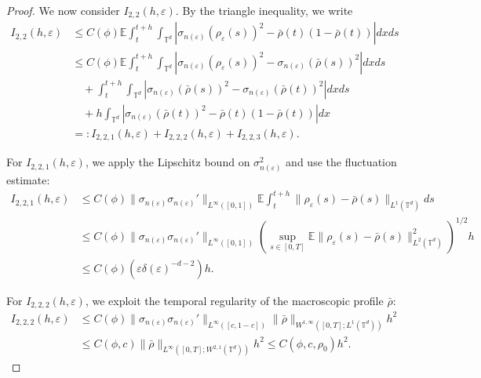 \documentclass[UTF-8,reqno]{amsart}
\numberwithin{equation}{section}
\def\leq{\leqslant}
\def\leq{\leqslant}
\begin{document}
\begin{proof}
\medskip

We now consider $ I_{2,2}(h,\varepsilon) $. By the triangle inequality, we write
\begin{align*}
I_{2,2}(h,\varepsilon)
&\leq C(\phi) \mathbb{E} \int_t^{t+h} \int_{\mathbb{T}^d} \left| \sigma_{n(\varepsilon)}(\rho_{\varepsilon}(s))^2 - \bar{\rho}(t)(1 - \bar{\rho}(t)) \right| dx ds \\
&\leq C(\phi) \mathbb{E} \int_t^{t+h} \int_{\mathbb{T}^d} \left| \sigma_{n(\varepsilon)}(\rho_{\varepsilon}(s))^2 - \sigma_{n(\varepsilon)}(\bar{\rho}(s))^2 \right| dx ds \\
&\quad + \int_t^{t+h} \int_{\mathbb{T}^d} \left| \sigma_{n(\varepsilon)}(\bar{\rho}(s))^2 - \sigma_{n(\varepsilon)}(\bar{\rho}(t))^2 \right| dx ds \\
&\quad + h \int_{\mathbb{T}^d} \left| \sigma_{n(\varepsilon)}(\bar{\rho}(t))^2 - \bar{\rho}(t)(1 - \bar{\rho}(t)) \right| dx \\
&=: I_{2,2,1}(h,\varepsilon) + I_{2,2,2}(h,\varepsilon) + I_{2,2,3}(h,\varepsilon).
\end{align*}

For $ I_{2,2,1}(h,\varepsilon) $, we apply the Lipschitz bound on $ \sigma_{n(\varepsilon)}^2 $ and use the fluctuation estimate:
\begin{align*}
I_{2,2,1}(h,\varepsilon)
&\leq C(\phi) \| \sigma_{n(\varepsilon)} \sigma_{n(\varepsilon)}' \|_{L^{\infty}([0,1])} 
\mathbb{E} \int_t^{t+h} \| \rho_{\varepsilon}(s) - \bar{\rho}(s) \|_{L^1(\mathbb{T}^d)} ds \\
&\leq C(\phi) \| \sigma_{n(\varepsilon)} \sigma_{n(\varepsilon)}' \|_{L^{\infty}([0,1])} 
\left( \sup_{s \in [0,T]} \mathbb{E} \| \rho_{\varepsilon}(s) - \bar{\rho}(s) \|_{L^2(\mathbb{T}^d)}^2 \right)^{1/2} h \\
&\leq C(\phi) \left( \varepsilon \delta(\varepsilon)^{-d-2} \right) h.
\end{align*}

For $ I_{2,2,2}(h,\varepsilon) $, we exploit the temporal regularity of the macroscopic profile $ \bar{\rho} $:
\begin{align*}
I_{2,2,2}(h,\varepsilon)
&\leq C(\phi) \| \sigma_{n(\varepsilon)}\sigma_{n(\varepsilon)}' \|_{L^{\infty}([c,1-c])} 
\| \bar{\rho} \|_{W^{1,\infty}([0,T]; L^1(\mathbb{T}^d))} h^2 \\
&\leq C(\phi, c) \| \bar{\rho} \|_{L^{\infty}([0,T]; W^{2,1}(\mathbb{T}^d))} h^2 
\leq C(\phi, c, \rho_0) h^2.
\end{align*}


\end{proof}
\end{document}
